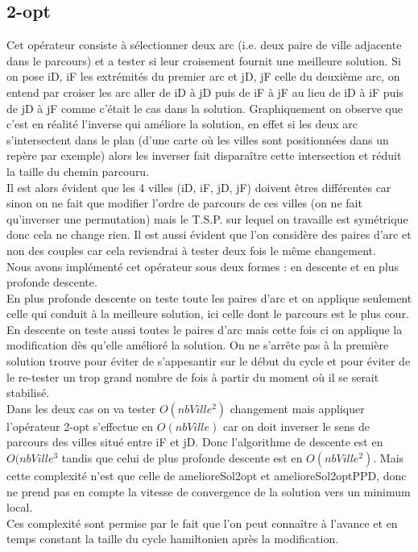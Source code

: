 \documentclass[12pt,a4paper]{article}
\begin{document}
\subsection{2-opt}
Cet opérateur consiste à sélectionner deux arc (i.e. deux paire de ville adjacente dans le parcours) et a tester si leur croisement fournit une meilleure solution. Si on pose iD, iF les extrémités du premier arc et jD, jF celle du deuxième arc, on entend par croiser les arc aller de iD à jD puis de iF à jF au lieu de iD à iF puis de jD à jF comme c’était le cas dans la solution. Graphiquement on observe que c'est en réalité l'inverse qui améliore la solution, en effet si les deux arc s’intersectent dans le plan (d'une carte où les villes sont positionnées dans un repère par exemple) alors les inverser fait disparaître cette intersection et réduit la taille du chemin parcouru.\\
Il est alors évident que les 4 villes (iD, iF, jD, jF) doivent êtres différentes car sinon on ne fait que modifier l'ordre de parcours de ces villes (on ne fait qu'inverser une permutation) mais le T.S.P. sur lequel on travaille est symétrique donc cela ne change rien. Il est aussi évident que l'on considère des paires d'arc et non des couples car cela reviendrai à tester deux fois le même changement.\\

Nous avons implémenté cet opérateur sous deux formes : en descente et en plus profonde descente.\\
En plus profonde descente on teste toute les paires d'arc et on applique seulement celle qui conduit à la meilleure solution, ici celle dont le parcours est le plus cour.\\
En descente on teste aussi toutes le paires d'arc mais cette fois ci on applique la modification dès qu'elle amélioré la solution. On ne s’arrête pas à la première solution trouve pour éviter de s'appesantir sur le début du cycle et pour éviter de le re-tester un trop grand nombre de fois à partir du moment où il se serait stabilisé.\\
Dans les deux cas on va tester $O(nbVille^2)$ changement mais appliquer l'opérateur 2-opt s’effectue en $O(nbVille)$ car on doit inverser le sens de parcours des villes situé entre iF et jD. Donc l'algorithme de descente est en $O(nbVille^3$ tandis que celui de plus profonde descente est en $O(nbVille^2)$. Mais cette complexité n'est que celle de amelioreSol2opt et amelioreSol2optPPD, donc ne prend pas en compte la vitesse de convergence de la solution vers un minimum local.\\
Ces complexité sont permise par le fait que l'on peut connaître à l'avance et en temps constant la taille du cycle hamiltonien après la modification.
 
\end{document}
